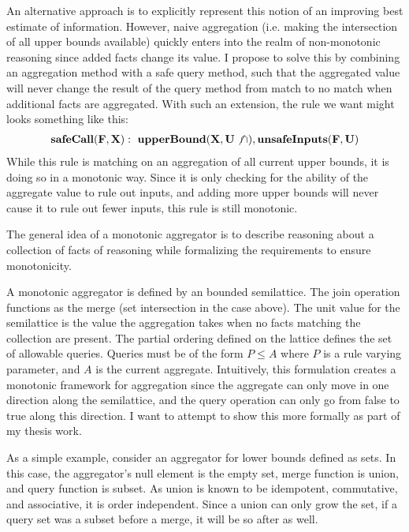 An alternative approach is to explicitly represent this notion of an improving best estimate of information.
However, naive aggregation (i.e. making the intersection of all upper bounds available) quickly enters into the realm of non-monotonic reasoning since added facts change its value.
I propose to solve this by combining an aggregation method with a safe query method, such that the aggregated value will never change the result of the query method from match to no match when additional facts are aggregated.
With such an extension, the rule we want might looks something like this:
\begin{gather*}
        {\bf safeCall}({\bf F}, {\bf X}) :~ {\bf upperBound}({\bf X}, {\bf U} \not \cap), {\bf unsafeInputs}({\bf F}, {\bf U})
\end{gather*}
While this rule is matching on an aggregation of all current upper bounds, it is doing so in a monotonic way.
Since it is only checking for the ability of the aggregate value to rule out inputs, and adding more upper bounds will never cause it to rule out fewer inputs, this rule is still monotonic.

The general idea of a monotonic aggregator is to describe reasoning about a collection of facts of reasoning while formalizing the requirements to ensure monotonicity.

A monotonic aggregator is defined by an bounded semilattice.
The join operation functions as the merge (set intersection in the case above).
The unit value for the semilattice is the value the aggregation takes when no facts matching the collection are present.
The partial ordering defined on the lattice defines the set of allowable queries.
Queries must be of the form $P \leq A$ where $P$ is a rule varying parameter, and $A$ is the current aggregate.
Intuitively, this formulation creates a monotonic framework for aggregation since the aggregate can only move in one direction along the semilattice, and the query operation can only go from false to true along this direction.
I want to attempt to show this more formally as part of my thesis work.

As a simple example, consider an aggregator for lower bounds defined as sets.
In this case, the aggregator's null element is the empty set, merge function is union, and query function is subset.
As union is known to be idempotent, commutative, and associative, it is order independent.
Since a union can only grow the set, if a query set was a subset before a merge, it will be so after as well.

